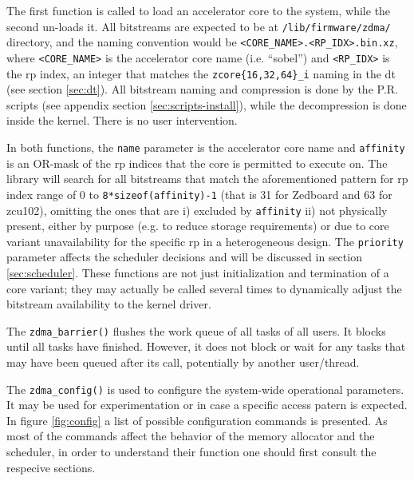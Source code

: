 The first function is called to load an accelerator core to the system, while
the second un-loads it.
All bitstreams are expected to be at \texttt{/lib/firmware/zdma/} directory,
and the naming convention would be \texttt{<CORE\_NAME>.<RP\_IDX>.bin.xz},
where \texttt{<CORE\_NAME>} is the accelerator core name (i.e. ``sobel'')
and \texttt{<RP\_IDX>} is the \gls{rp} index, an integer that matches
the \texttt{zcore\{16,32,64\}\_i} naming in the \gls{dt} (see section \ref{sec:dt}).
All bitstream naming and compression is done by the P.R. scripts (see appendix section \ref{sec:scripts-install}),
while the decompression is done inside the kernel. There is no user intervention.

In both functions, the \texttt{name} parameter is the accelerator core name and 
\texttt{affinity} is an OR-mask of the \gls{rp} indices that the core is permitted to execute on.
The library will search for all bitstreams that match the aforementioned pattern for 
\gls{rp} index range of 0 to \texttt{8*sizeof(affinity)-1} (that is 31 for Zedboard and 63 for zcu102),
omitting the ones that are i) excluded by \texttt{affinity} ii) not physically present,
either by purpose (e.g. to reduce storage requirements) or due to core variant unavailability for
the specific \gls{rp} in a heterogeneous design. The \texttt{priority} parameter affects
the scheduler decisions and will be discussed in section \ref{sec:scheduler}.
These functions are not just initialization and termination of a core variant; they may
actually be called several times to dynamically adjust the bitstream availability to the kernel driver.

The \texttt{zdma\_barrier()} flushes the work queue of all tasks of all users.
It blocks until all tasks have finished. However, it does not block or wait for any
tasks that may have been queued after its call, potentially by another user/thread.

The \texttt{zdma\_config()} is used to configure the system-wide operational parameters.
It may be used for experimentation or in case a specific access patern is expected. 
In figure \ref{fig:config} a list of possible configuration commands is presented.
As most of the commands affect the behavior of the memory allocator and the scheduler,
in order to understand their function
one should first consult the respecive sections.

